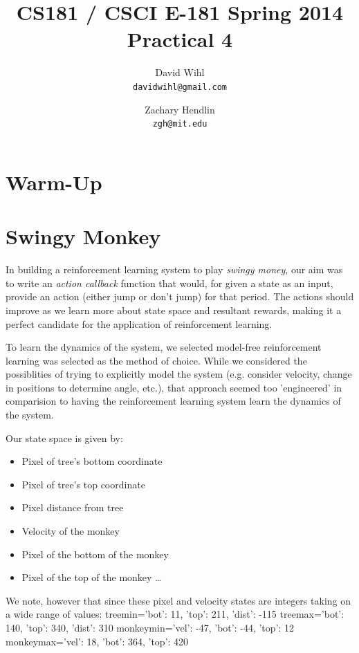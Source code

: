 \documentclass[11pt, oneside]{article}   	%
\title{CS181 / CSCI E-181 Spring 2014 Practical 4}
\author{
  David Wihl\\
  \texttt{davidwihl@gmail.com}
  \and
  Zachary Hendlin\\
  \texttt{zgh@mit.edu} 
}
\begin{document}
\maketitle
\section*{Warm-Up}


\section*{Swingy Monkey}
In building a reinforcement learning system to play \textit{swingy money}, our aim was to write an \textit{action callback} function that would, for given a state as an input, provide an action (either jump or don't jump) for that period. The actions should improve as we learn more about state space and resultant rewards, making it a perfect candidate for the application of reinforcement learning.
\newline 

To learn the dynamics of the system, we selected model-free reinforcement learning was selected as the method of choice. While we considered the possiblities of trying to explicitly model the system (e.g. consider velocity, change in positions to determine angle, etc.), that approach seemed too 'engineered' in comparision to having the reinforcement learning system learn the dynamics of the system.
\newline 

Our state space is given by:

\begin{itemize}

  \item Pixel of tree's bottom coordinate
  \item Pixel of tree's top coordinate
  \item Pixel distance from tree
  \item Velocity of the monkey
  \item Pixel of the bottom of the monkey
  \item Pixel of the top of the monkey \ldots

\end{itemize}

We note, however that since these pixel and velocity states are integers taking on a wide range of values:
\newline
treemin={'bot': 11, 'top': 211, 'dist': -115}
\newline
treemax={'bot': 140, 'top': 340, 'dist': 310}
\newline
monkeymin={'vel': -47, 'bot': -44, 'top': 12}
\newline
monkeymax={'vel': 18, 'bot': 364, 'top': 420}
\end{document}
